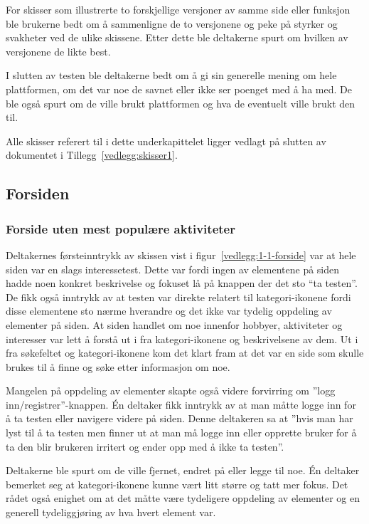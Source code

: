For skisser som illustrerte to forskjellige versjoner av samme side eller funksjon ble brukerne bedt om å sammenligne de to versjonene og peke på styrker og svakheter ved de ulike skissene. Etter dette ble deltakerne spurt om hvilken av versjonene de likte best.

I slutten av testen ble deltakerne bedt om å gi sin generelle mening om hele plattformen, om det var noe de savnet eller ikke ser poenget med å ha med. De ble også spurt om de ville brukt plattformen og hva de eventuelt ville brukt den til.

Alle skisser referert til i dette underkapittelet ligger vedlagt på slutten av dokumentet i Tillegg~\ref{vedlegg:skisser1}.

\subsection{Forsiden}

\subsubsection{Forside uten mest populære aktiviteter}
Deltakernes førsteinntrykk av skissen vist i figur~\ref{vedlegg:1-1-forside} var at hele siden var en slags interessetest. Dette var fordi ingen av elementene på siden hadde noen konkret beskrivelse og fokuset lå på knappen der det sto “ta testen”. De fikk også inntrykk av at testen var direkte relatert til kategori-ikonene fordi disse elementene sto nærme hverandre og det ikke var tydelig oppdeling av elementer på siden. At siden handlet om noe innenfor hobbyer, aktiviteter og interesser var lett å forstå ut i fra kategori-ikonene og beskrivelsene av dem. Ut i fra søkefeltet og kategori-ikonene kom det klart fram at det var en side som skulle brukes til å finne og søke etter informasjon om noe. 

Mangelen på oppdeling av elementer skapte også videre forvirring om ''logg inn/registrer''-knappen. Én deltaker fikk inntrykk av at man måtte logge inn for å ta testen eller navigere videre på siden. Denne deltakeren sa at ''hvis man har lyst til å ta testen men finner ut at man må logge inn eller opprette bruker for å ta den blir brukeren irritert og ender opp med å ikke ta testen''.

Deltakerne ble spurt om de ville fjernet, endret på eller legge til noe. Én deltaker bemerket seg at kategori-ikonene kunne vært litt større og tatt mer fokus. Det rådet også enighet om at det måtte være tydeligere oppdeling av elementer og en generell tydeliggjøring av hva hvert element var.


